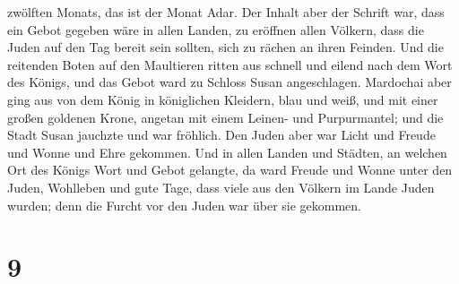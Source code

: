 zwölften Monats, das ist der Monat Adar.  Der Inhalt aber
der Schrift war, dass ein Gebot gegeben wäre in allen Landen, zu
eröffnen allen Völkern, dass die Juden auf den Tag bereit sein sollten,
sich zu rächen an ihren Feinden.  Und die reitenden Boten
auf den Maultieren ritten aus schnell und eilend nach dem Wort des
Königs, und das Gebot ward zu Schloss Susan angeschlagen.
 Mardochai aber ging aus von dem König in königlichen
Kleidern, blau und weiß, und mit einer großen goldenen Krone, angetan
mit einem Leinen- und Purpurmantel; und die Stadt Susan jauchzte und war
fröhlich.  Den Juden aber war Licht und Freude und Wonne
und Ehre gekommen.  Und in allen Landen und Städten, an
welchen Ort des Königs Wort und Gebot gelangte, da ward Freude und Wonne
unter den Juden, Wohlleben und gute Tage, dass viele aus den Völkern im
Lande Juden wurden; denn die Furcht vor den Juden war über sie gekommen.

\hypertarget{section-8}{%
\section{9}\label{section-8}}


